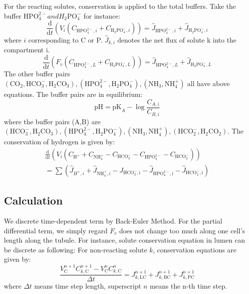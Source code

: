 \documentclass{article}
\begin{document}
For the reacting solutes, conservation is applied to the total buffers. Take the buffer $\mathrm{HPO}_{4}^{2-} and {H}_{2} \mathrm{PO}_{4}^{-}$ for instance:
\begin{equation}
\frac{\mathrm{d}}{\mathrm{d} t}\left(V_{i}\left(C_{\mathrm{HPO}_{4}^{2-}, i}+C_{\mathrm{H}_{2} \mathrm{PO}_{4}^{-}, i}\right)\right)=\hat{J}_{\mathrm{HPO}_{4}^{2-}, i}+\hat{J}_{\mathrm{H}_{2} \mathrm{PO}_{4}^{-}, i}
\end{equation}
where $i$ corresponding to C or P. $\hat{J}_{k, i}$ denotes the net flux of solute k into the compartment i.
\begin{equation}
\frac{\mathrm{d}}{\mathrm{d} t}\left(F_{v}\left(C_{\mathrm{HPO}_{4}^{2-}, L}+C_{\mathrm{H}_{2} \mathrm{PO}_{4}^{-}, L}\right)\right)=\hat{J}_{\mathrm{HPO}_{4}^{2-}, L}+\hat{J}_{\mathrm{H}_{2} \mathrm{PO}_{4}^{-}, L}
\end{equation}
The other buffer pairs $\left(\mathrm{CO}_{2},\mathrm{HCO}_{3}^{-}, \mathrm{H}_{2} \mathrm{CO}_{3}\right),\left(\mathrm{HPO}_{4}^{2-}, \mathrm{H}_{2} \mathrm{PO}_{4}^{-}\right),\left(\mathrm{NH}_{3}, \mathrm{NH}_{4}^{+}\right)$ all have above equations.
The buffer pairs are in equilibrium:
\begin{equation}
\mathrm{pH}=\mathrm{pK}_{A}-\log \frac{C_{A, i}}{C_{B, i}}
\end{equation}
where the buffer pairs (A,B) are $\left(\mathrm{HCO}_{3}^{-}, \mathrm{H}_{2} \mathrm{CO}_{3}\right),\left(\mathrm{HPO}_{4}^{2-}, \mathrm{H}_{2} \mathrm{PO}_{4}^{-}\right),\left(\mathrm{NH}_{3}, \mathrm{NH}_{4}^{+}\right),\left(\mathrm{HCO}_{2}^{-}, \mathrm{H}_{2} \mathrm{CO}_{2}\right)$.
The conservation of hydrogen is given by:
\begin{equation}
\begin{aligned}
\frac{\mathrm{d}}{\mathrm{d} t}\left(V_{i} (C_{\mathrm{H}^{+}}+C_{\mathrm{NH}_{4}^{+}}-C_{\mathrm{HCO_{3}^{-}}}-C_{\mathrm{HPO_{4}^{2-}}}-C_{\mathrm{HCO_{2}^{-}}}) \right)\\=\sum (\hat{J}_{H^{+}, i}+\hat{J}_{\mathrm{NH}_{4}^{+}, i}-\hat{J}_{ \mathrm{HCO_{3}^{-}, i}}-\hat{J}_{ \mathrm{HPO_{4}^{2-}, i}}-\hat{J}_{ \mathrm{HCO_{2}^{-}, i}})
\end{aligned}
\end{equation}

\subsection{Calculation}
We discrete time-dependent term by Back-Euler Method. For the partial differential term, we simply regard $F_{v}$ does not change too much along one cell's length along the tubule. For instance, solute conservation equation in lumen can be discrete as following:
For non-reacting solute $k$, conservation equations are given by:
\begin{equation}
\frac{V_{\mathrm{C}}^{n+1} C_{k, \mathrm{C}}^{n+1}-V_{\mathrm{C}}^{n} C_{k, \mathrm{C}}^{n}}{\Delta t}=J_{k, \mathrm{LC}}^{n+1}+J_{k, \mathrm{BC}}^{n+1}+J_{k, \mathrm{PC}}^{n+1}
\end{equation}
where ${\Delta t}$ means time step length, superscript $n$ means the n-th time step.
\end{document}
